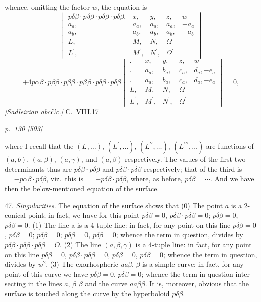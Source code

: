 \documentclass[11pt,a4paper]{book}
\begin{document}
whence, omitting the factor $w$, the equation is
\[
\begin{vmatrix}
p\delta\beta\cdot p\delta\beta\cdot p\delta\beta\cdot p\delta\beta, & x, & y, & z, & w \\
a_a, & a_a, & a_a, & a_a, & -a_a \\
a_b, & a_b, & a_b, & a_b, & -a_b \\
L, & M, & N, & \Omega \\
L^{\prime}, & M^{\prime}, & N^{\prime}, & \Omega^{\prime}
\end{vmatrix}
\]
\[
+ \mathit{4 p\alpha\beta\cdot p\beta\beta\cdot p\beta\beta\cdot p\beta\beta\cdot p\delta\beta\cdot p\delta\beta}
\begin{vmatrix}
. & x, & y, & z, & w \\
. & a_a, & b_a, & c_a, & d_a, -e_a \\
. & a_a, & b_a, & c_a, & d_a, -e_a \\
L, & M, & N, & \Omega \\
L^{\prime}, & M^{\prime}, & N^{\prime}, & \Omega^{\prime}
\end{vmatrix}
= 0,
\]
\textit{[Sadleirian abc\&c.]} \hfill C.\ VIII.\hfill 17

\clearpage

\bigskip
\textit{p.~130 [503]}
\smallskip

\noindent
where I recall that the $(L, \ldots)$, $(L^{\prime}, \ldots)$, $(L^{\prime\prime}, \ldots)$, $(L^{\prime\prime\prime}, \ldots)$ are functions of $(a, b)$, $(a, \beta)$,
$(a, \gamma)$, and $(a, \beta)$ respectively. The values of the first two determinants thus are
$p\delta\beta\cdot p\delta\beta$ and $p\delta\beta\cdot p\delta\beta$ respectively; that of the third is $= -p\alpha\beta\cdot p\delta\beta$, viz.\ this is
$= -p\delta\beta\cdot p\delta\beta$, where, as before, $p\delta\beta = \cdots$. And we have then the below-mentioned equation of the
surface.

47. \textit{Singularities}. The equation of the surface shows that
\quad(0) The point $a$ is a 2-conical point; in fact, we have for this point $p\delta\beta = 0$,
$p\delta\beta\cdot p\delta\beta = 0$; $p\delta\beta = 0$, $p\delta\beta = 0$.
\quad(1) The line a is a 4-tuple line: in fact, for any point on this line $p\delta\beta = 0$,
$p\delta\beta = 0$; $p\delta\beta = 0$; $p\delta\beta = 0$, $p\delta\beta = 0$; whence the term in question, divides by $p\delta\beta\cdot p\delta\beta\cdot p\delta\beta = O$.
\quad(2) The line $(a, \beta, \gamma)$ is a 4-tuple line: in fact, for any point on this line $p\delta\beta = 0$,
$p\delta\beta\cdot p\delta\beta = 0$, $p\delta\beta = 0$, $p\delta\beta = 0$; whence the term in question, divides by $w^2$.
\quad(3) The exorhospheric \textit{aa}$\beta$, $\beta$ is a simple curve: in fact, for any point of
this curve we have $p\delta\beta = 0$, $p\delta\beta = 0$; whence the term in question inter-
secting in the lines $a$, $\beta$ $\beta$ and the curve $a a \beta\beta$. It is, moreover, obvious that
the surface is touched along the curve by the hyperboloid $p\delta\beta$.
\end{document}
